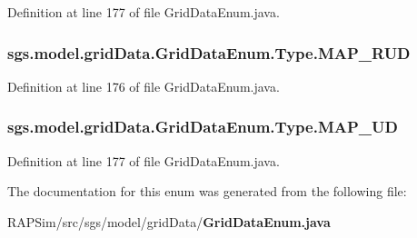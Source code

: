 Definition at line 177 of file Grid\-Data\-Enum.\-java.

\subsubsection[{M\-A\-P\-\_\-\-R\-U\-D}]{\setlength{\rightskip}{0pt plus 5cm}sgs.\-model.\-grid\-Data.\-Grid\-Data\-Enum.\-Type.\-M\-A\-P\-\_\-\-R\-U\-D}\label{enumsgs_1_1model_1_1grid_data_1_1_grid_data_enum_1_1_type_a3cde02f5987a289c5a72b5c92422b105}


Definition at line 176 of file Grid\-Data\-Enum.\-java.

\subsubsection[{M\-A\-P\-\_\-\-U\-D}]{\setlength{\rightskip}{0pt plus 5cm}sgs.\-model.\-grid\-Data.\-Grid\-Data\-Enum.\-Type.\-M\-A\-P\-\_\-\-U\-D}\label{enumsgs_1_1model_1_1grid_data_1_1_grid_data_enum_1_1_type_a34b7f670d7a5342506dbadf3df582d01}


Definition at line 177 of file Grid\-Data\-Enum.\-java.



The documentation for this enum was generated from the following file\-:\begin{DoxyCompactItemize}
\item 
R\-A\-P\-Sim/src/sgs/model/grid\-Data/{\bf Grid\-Data\-Enum.\-java}\end{DoxyCompactItemize}
